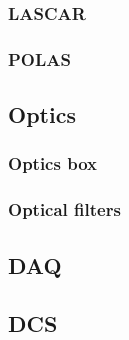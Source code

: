 \documentclass[UKenglish,texlive=2013]{\ATLASLATEXPATH atlasdoc}
\begin{document}
\subsubsection{LASCAR}



\subsubsection{POLAS}



\subsection{Optics}

\subsubsection{Optics box}



\subsubsection{Optical filters}




\subsection{DAQ}
\label{sec:daq}




\subsection{DCS}


\end{document}
